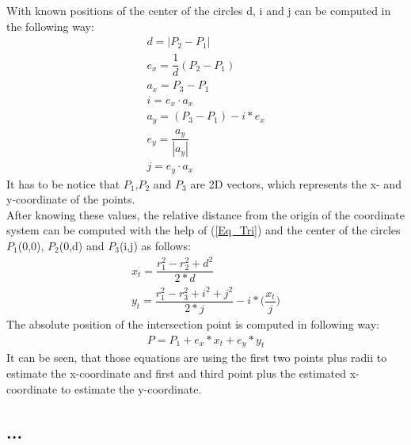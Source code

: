With known positions of the center of the circles d, i and j can be computed in the following way\cite{Cotera.2016}:
\begin{align}
d = |P_2 - P_1| \\ 
e_x = \dfrac{1}{d}(P_2 - P_1) \\
a_x = P_3 - P_1 \\
i = e_x \cdot a_x \\
a_y = (P_3 - P_1) - i * e_x \\
e_y = \dfrac{a_y}{|a_y|} \\
j = e_y \cdot a_x
\end{align}
It has to be notice that $P_1$,$P_2$  and $P_3$ are 2D vectors, which represents the x- and y-coordinate of the points.\\ 
After knowing these values, the relative distance from the origin of the coordinate system can be computed with the help of (\ref{Eq_Tri}) and the center of the circles $P_1$(0,0), $P_2$(0,d) and $P_3$(i,j) as follows:
\begin{align}
x_t = \dfrac{r_1^2 - r_2^2 + d^2}{2*d} \\
y_t = \dfrac{r_1^2 - r_3^2 + i^2 + j^2}{2*j} - i* \bigg(\dfrac{x_t}{j}\bigg) 
\end{align}
The absolute position of the intersection point is computed in following way:
\begin{align}
P = P_1 + e_x * x_t + e_y * y_t 
\end{align}
It can be seen, that those equations are using the first two points plus radii to estimate the x-coordinate and first and third point plus the estimated x-coordinate to estimate the y-coordinate.\\ 

\subsection{...}